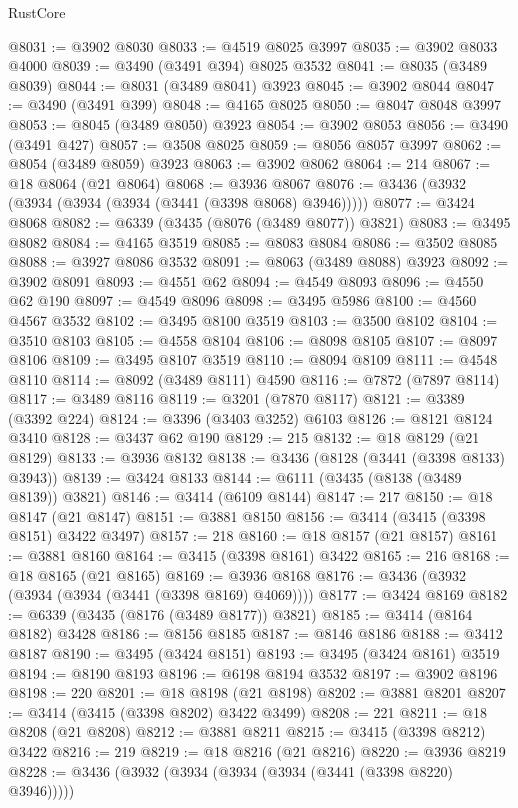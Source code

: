 \begin{lexlean}{RustCore}
\begin{coremodule}
@8031 := @3902 @8030
@8033 := @4519 @8025 @3997
@8035 := @3902 @8033 @4000
@8039 := @3490 (@3491 @394) @8025 @3532
@8041 := @8035 (@3489 @8039)
@8044 := @8031 (@3489 @8041) @3923
@8045 := @3902 @8044
@8047 := @3490 (@3491 @399)
@8048 := @4165 @8025
@8050 := @8047 @8048 @3997
@8053 := @8045 (@3489 @8050) @3923
@8054 := @3902 @8053
@8056 := @3490 (@3491 @427)
@8057 := @3508 @8025
@8059 := @8056 @8057 @3997
@8062 := @8054 (@3489 @8059) @3923
@8063 := @3902 @8062
@8064 := 214
@8067 := @18 @8064 (@21 @8064)
@8068 := @3936 @8067
@8076 := @3436 (@3932 (@3934 (@3934 (@3934 (@3441 (@3398 @8068) @3946)))))
@8077 := @3424 @8068
@8082 := @6339 (@3435 (@8076 (@3489 @8077)) @3821)
@8083 := @3495 @8082
@8084 := @4165 @3519
@8085 := @8083 @8084
@8086 := @3502 @8085
@8088 := @3927 @8086 @3532
@8091 := @8063 (@3489 @8088) @3923
@8092 := @3902 @8091
@8093 := @4551 @62
@8094 := @4549 @8093
@8096 := @4550 @62 @190
@8097 := @4549 @8096
@8098 := @3495 @5986
@8100 := @4560 @4567 @3532
@8102 := @3495 @8100 @3519
@8103 := @3500 @8102
@8104 := @3510 @8103
@8105 := @4558 @8104
@8106 := @8098 @8105
@8107 := @8097 @8106
@8109 := @3495 @8107 @3519
@8110 := @8094 @8109
@8111 := @4548 @8110
@8114 := @8092 (@3489 @8111) @4590
@8116 := @7872 (@7897 @8114)
@8117 := @3489 @8116
@8119 := @3201 (@7870 @8117)
@8121 := @3389 (@3392 @224)
@8124 := @3396 (@3403 @3252) @6103
@8126 := @8121 @8124 @3410
@8128 := @3437 @62 @190
@8129 := 215
@8132 := @18 @8129 (@21 @8129)
@8133 := @3936 @8132
@8138 := @3436 (@8128 (@3441 (@3398 @8133) @3943))
@8139 := @3424 @8133
@8144 := @6111 (@3435 (@8138 (@3489 @8139)) @3821)
@8146 := @3414 (@6109 @8144)
@8147 := 217
@8150 := @18 @8147 (@21 @8147)
@8151 := @3881 @8150
@8156 := @3414 (@3415 (@3398 @8151) @3422 @3497)
@8157 := 218
@8160 := @18 @8157 (@21 @8157)
@8161 := @3881 @8160
@8164 := @3415 (@3398 @8161) @3422
@8165 := 216
@8168 := @18 @8165 (@21 @8165)
@8169 := @3936 @8168
@8176 := @3436 (@3932 (@3934 (@3934 (@3441 (@3398 @8169) @4069))))
@8177 := @3424 @8169
@8182 := @6339 (@3435 (@8176 (@3489 @8177)) @3821)
@8185 := @3414 (@8164 @8182) @3428
@8186 := @8156 @8185
@8187 := @8146 @8186
@8188 := @3412 @8187
@8190 := @3495 (@3424 @8151)
@8193 := @3495 (@3424 @8161) @3519
@8194 := @8190 @8193
@8196 := @6198 @8194 @3532
@8197 := @3902 @8196
@8198 := 220
@8201 := @18 @8198 (@21 @8198)
@8202 := @3881 @8201
@8207 := @3414 (@3415 (@3398 @8202) @3422 @3499)
@8208 := 221
@8211 := @18 @8208 (@21 @8208)
@8212 := @3881 @8211
@8215 := @3415 (@3398 @8212) @3422
@8216 := 219
@8219 := @18 @8216 (@21 @8216)
@8220 := @3936 @8219
@8228 := @3436 (@3932 (@3934 (@3934 (@3934 (@3441 (@3398 @8220) @3946)))))

\end{coremodule}
\end{lexlean}
